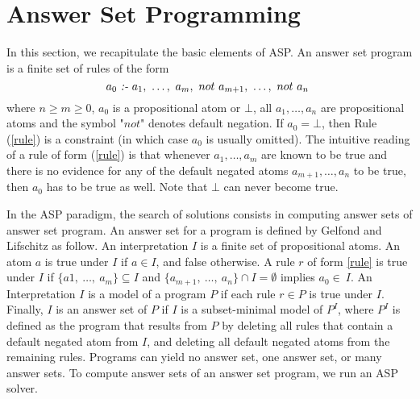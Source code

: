 \section{Answer Set Programming}
\label{sec:asp}
	In this section, we recapitulate the basic elements of ASP.
	An answer set program is a finite set of rules of the form
	\begin{equation}
		\label{rule}
		a_{0}\ \emph{:-}\ a_{1},\ \ldots,\ a_{m},\ not\ a_{m+1},\ \ldots,\ not\ a_{n}\
	\end{equation}
	where $n \ge m \ge 0$, $a_{0}$ is a propositional atom or $\bot$, all
	$a_{1}, \ldots ,a_{n}$ are propositional atoms and the symbol "$not$" denotes default negation.
	If $a_{0} = \bot$, then Rule (\ref{rule}) is a constraint (in which case $a_{0}$ is usually omitted).
	The intuitive reading of a rule of form (\ref{rule}) is that whenever $a_{1}, \ldots, a_{m}$
	are known to be true and there is no evidence for any of the default negated atoms $a_{m+1}, \ldots, a_{n}$ to be true, then $a_{0}$ has to be true as well.
	Note that $\bot$ can never become true.
	
	In the ASP paradigm, the search of solutions consists in computing answer sets of answer set program.
	An answer set for a program is defined by Gelfond and Lifschitz \cite{DBLP:conf/iclp/GelfondL88} as follow.
	An interpretation $I$ is a finite set of propositional atoms.
	An atom $a$ is true under $I$ if $a \in I$, and false otherwise.
	A rule $r$ of form \ref{rule} is true under $I$ if $\{a1,\ \dots,\ a_{m}\} \subseteq I$ and $\{a_{m+1},\ \ldots,\ a_{n}\} \cap I = \emptyset$ implies $a_{0} \in\ I$.
	An Interpretation $I$ is a model of a program $P$ if each rule $r \in P$ is true under $I$.
	Finally, $I$ is an answer set of $P$ if $I$ is a subset-minimal model of $P^{I}$,
	where $P^{I}$ is defined as the program that results from $P$ by deleting all rules that contain a default negated atom from $I$, 
	and deleting all default negated atoms from the remaining rules.
	Programs can yield no answer set, one answer set, or many answer sets.
	To compute answer sets of an answer set program, we run an ASP solver.
